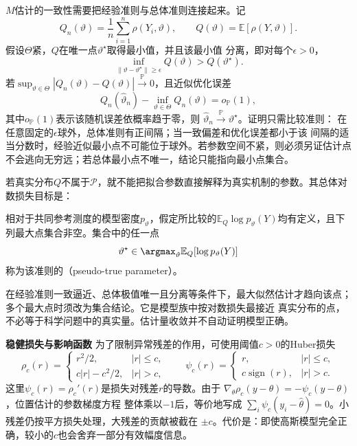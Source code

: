 \(M\)估计的一致性需要把经验准则与总体准则连接起来。记
\[
  Q_n(\vartheta)=\frac1n\sum_{i=1}^n\rho(Y_i,\vartheta),
  \qquad
  Q(\vartheta)=\mathbb{E}[\rho(Y,\vartheta)].
\]
假设\(\Theta\)紧，\(Q\)在唯一点\(\vartheta^\star\)取得最小值，并且该最小值
分离，即对每个\(\epsilon>0\)，
\[
  \inf_{\lVert\vartheta-\vartheta^\star\rVert\geq\epsilon}
  Q(\vartheta)>Q(\vartheta^\star).
\]
若\(\sup_{\vartheta\in\Theta}|Q_n(\vartheta)-Q(\vartheta)|
\xrightarrow{\mathbb{P}}0\)，且近似优化误差
\[
  Q_n(\widehat\vartheta_n)-\inf_{\vartheta\in\Theta}Q_n(\vartheta)
  =o_{\mathbb{P}}(1),
\]
其中\(o_{\mathbb{P}}(1)\)表示该随机误差依概率趋于零，则
\(\widehat\vartheta_n\xrightarrow{\mathbb{P}}\vartheta^\star\)。证明只需比较准则：
在任意固定的\(\epsilon\)球外，总体准则有正间隔；当一致偏差和优化误差都小于该
间隔的适当分数时，经验近似最小点不可能位于球外。若参数空间不紧，则必须另证估计点
不会逃向无穷远；若总体最小点不唯一，结论只能指向最小点集合。

若真实分布\(Q\)不属于\(\mathcal P\)，就不能把拟合参数直接解释为真实机制的参数。其总体对数损失目标是：
\begin{definition}[伪真参数]
  \label{def:statistics-pseudo-true-parameter}
相对于共同参考测度的模型密度\(p_\vartheta\)，假定所比较的\(\mathbb E_Q\log p_\vartheta(Y)\)均有定义，且下列最大点集合非空。集合中的任一点
\[
  \vartheta^\star
  \in\argmax_\vartheta\mathbb{E}_Q[\log p_\vartheta(Y)]
\]
称为该准则的（pseudo-true parameter）。
\end{definition}
在经验准则一致逼近、总体极值唯一且分离等条件下，最大似然估计才趋向该点；多个最大点时须改为集合结论。它是模型族中按对数损失最接近
真实分布的点，不必等于科学问题中的真实量。估计量收敛并不自动证明模型正确。

\par\medskip\noindent\textbf{稳健损失与影响函数}\quad
为了限制异常残差的作用，可使用阈值\(c>0\)的Huber损失
\[
  \rho_c(r)=
  \begin{cases}
    r^2/2,& |r|\leq c,\\
    c|r|-c^2/2,& |r|>c,
  \end{cases}
  \qquad
  \psi_c(r)=
  \begin{cases}
    r,& |r|\leq c,\\
    c\operatorname{sign}(r),& |r|>c.
  \end{cases}
\]
这里\(\psi_c(r)=\rho_c'(r)\)是损失对残差\(r\)的导数。由于
\(\nabla_\theta\rho_c(y-\theta)=-\psi_c(y-\theta)\)，位置估计的参数梯度方程
整体乘以\(-1\)后，等价地写成
\(\sum_i\psi_c(y_i-\widehat\theta)=0\)。小残差仍按平方损失处理，大残差的贡献被截在
\(\pm c\)。代价是：即使高斯模型完全正确，较小的\(c\)也会舍弃一部分有效幅度信息。

